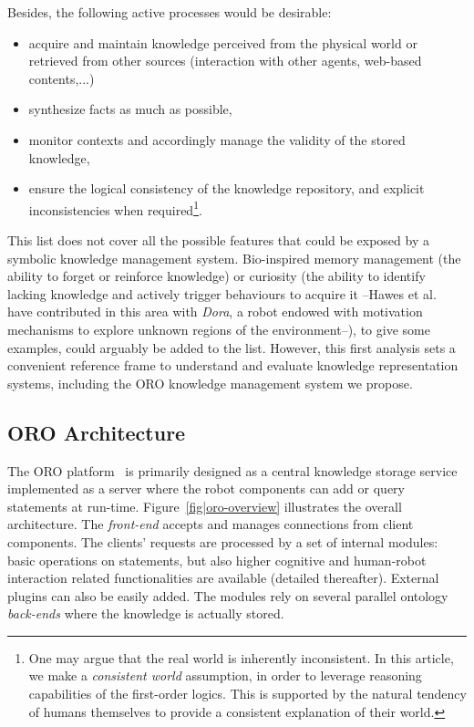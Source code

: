 \documentclass{svmult}
\begin{document}
Besides, the following active processes would be desirable:
\begin{itemize}
	\item acquire and maintain knowledge perceived from the physical world or
	retrieved from other sources (interaction with other agents, web-based contents,...)
	\item synthesize facts as much as possible,
	\item monitor contexts and accordingly manage the validity of the stored knowledge,
	\item ensure the logical consistency of the knowledge repository, and
	explicit inconsistencies when required\footnote{One may argue that the real world is 
	inherently inconsistent. In this article, we make a
	\textit{consistent world} assumption, in order to leverage reasoning
	capabilities of the first-order logics. This is supported by the natural
	tendency of humans themselves to provide a consistent explanation of their
	world.}.
\end{itemize}

This list does not cover all the possible features that could be exposed by a
symbolic knowledge management system. Bio-inspired memory management (the
ability to forget or reinforce knowledge) or curiosity (the ability to identify
lacking knowledge and actively trigger behaviours to acquire it --Hawes et
al.~\cite{Hawes2011} have contributed in this area with \emph{Dora}, a
robot endowed with motivation mechanisms to explore unknown regions of
the environment--), to give some examples, could arguably be added to the list.
However, this first analysis sets a convenient reference frame to understand
and evaluate knowledge representation systems, including the \textsc{ORO}
knowledge management system we propose.


\subsection{ORO Architecture}

The ORO platform~\cite{Lemaignan2010} is primarily designed as a central
knowledge storage service implemented as a server where the robot
components can add or query statements at run-time. Figure~\ref{fig|oro-overview}
illustrates the overall architecture. The \emph{front-end} accepts and manages
connections from client components. The clients' requests are processed by a
set of internal modules: basic operations on statements, but also higher
cognitive and human-robot interaction related functionalities are available
(detailed thereafter). External plugins can also be easily added. The modules
rely on several parallel ontology \emph{back-ends} where the knowledge is
actually stored.
\end{document}
